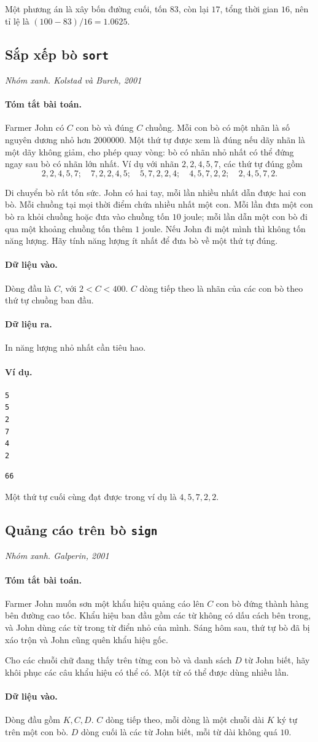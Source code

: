\documentclass[11pt]{article}
\newcommand{\problem}[4]{%
  \subsection[#1 (#2)]{#1 \hfill {\normalsize\texttt{#2}}}%
  \noindent\textit{#3. #4}\par\smallskip
}
\newcommand{\iosec}[1]{\paragraph{#1}}
\begin{document}
Một phương án là xây bốn đường cuối, tốn \(83\), còn lại \(17\), tổng thời gian
\(16\), nên tỉ lệ là \((100-83)/16=1.0625\).

\problem{Sắp xếp bò}{sort}{Nhóm xanh}{Kolstad và Burch, 2001}

\iosec{Tóm tắt bài toán.}
Farmer John có \(C\) con bò và đúng \(C\) chuồng. Mỗi con bò có một nhãn là số
nguyên dương nhỏ hơn \(2000000\). Một thứ tự được xem là đúng nếu dãy nhãn là
một dãy không giảm, cho phép quay vòng: bò có nhãn nhỏ nhất có thể đứng ngay
sau bò có nhãn lớn nhất. Ví dụ với nhãn \(2,2,4,5,7\), các thứ tự đúng gồm
\[
2,2,4,5,7;\quad 7,2,2,4,5;\quad 5,7,2,2,4;\quad
4,5,7,2,2;\quad 2,4,5,7,2.
\]

Di chuyển bò rất tốn sức. John có hai tay, mỗi lần nhiều nhất dẫn được hai con
bò. Mỗi chuồng tại mọi thời điểm chứa nhiều nhất một con. Mỗi lần đưa một con
bò ra khỏi chuồng hoặc đưa vào chuồng tốn \(10\) joule; mỗi lần dẫn một con bò
đi qua một khoảng chuồng tốn thêm \(1\) joule. Nếu John đi một mình thì không
tốn năng lượng. Hãy tính năng lượng ít nhất để đưa bò về một thứ tự đúng.

\iosec{Dữ liệu vào.}
Dòng đầu là \(C\), với \(2<C<400\). \(C\) dòng tiếp theo là nhãn của các con bò
theo thứ tự chuồng ban đầu.

\iosec{Dữ liệu ra.}
In năng lượng nhỏ nhất cần tiêu hao.

\iosec{Ví dụ.}
\begin{verbatim}
5
5
2
7
4
2
\end{verbatim}

\begin{verbatim}
66
\end{verbatim}

Một thứ tự cuối cùng đạt được trong ví dụ là \(4,5,7,2,2\).

\problem{Quảng cáo trên bò}{sign}{Nhóm xanh}{Galperin, 2001}

\iosec{Tóm tắt bài toán.}
Farmer John muốn sơn một khẩu hiệu quảng cáo lên \(C\) con bò đứng thành hàng
bên đường cao tốc. Khẩu hiệu ban đầu gồm các từ không có dấu cách bên trong,
và John dùng các từ trong từ điển nhỏ của mình. Sáng hôm sau, thứ tự bò đã bị
xáo trộn và John cũng quên khẩu hiệu gốc.

Cho các chuỗi chữ đang thấy trên từng con bò và danh sách \(D\) từ John biết,
hãy khôi phục các câu khẩu hiệu có thể có. Một từ có thể được dùng nhiều lần.

\iosec{Dữ liệu vào.}
Dòng đầu gồm \(K,C,D\). \(C\) dòng tiếp theo, mỗi dòng là một chuỗi dài \(K\)
ký tự trên một con bò. \(D\) dòng cuối là các từ John biết, mỗi từ dài không
quá \(10\).
\end{document}
